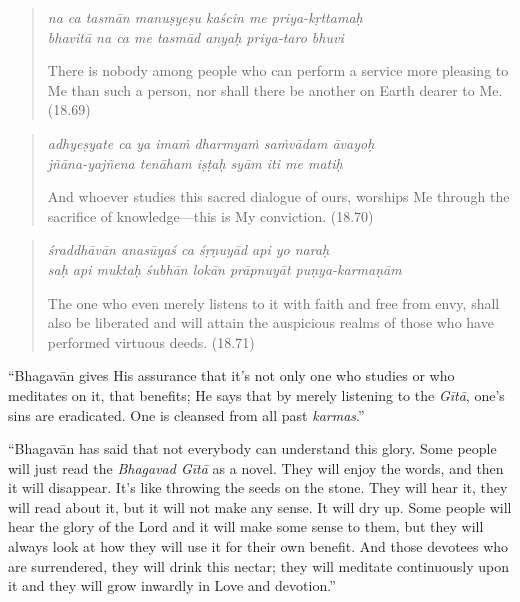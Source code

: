 \documentclass[12pt, twoside, openright]{memoir}
\begin{document}
\par
\begin{verse}
\textit{na ca tasmān manuṣyeṣu kaścin me priya-kṛttamaḥ} \\
\textit{bhavitā na ca me tasmād anyaḥ priya-taro bhuvi}

\noindent There is nobody among people who can perform a service more pleasing to Me than such a person, nor shall there be another on Earth dearer to Me. (18.69)
\end{verse}
\par



\par
\begin{verse}
\textit{adhyeṣyate ca ya imaṁ dharmyaṁ saṁvādam āvayoḥ} \\
\textit{jñāna-yajñena tenāham iṣṭaḥ syām iti me matiḥ}

\noindent And whoever studies this sacred dialogue of ours, worships Me through the sacrifice of knowledge---this is My conviction. (18.70)
\end{verse}
\par



\par
\begin{verse}
\textit{śraddhāvān anasūyaś ca śṛṇuyād api yo naraḥ} \\
\textit{saḥ api muktaḥ śubhān lokān prāpnuyāt puṇya-karmaṇām}

\noindent The one who even merely listens to it with faith and free from envy, shall also be liberated and will attain the auspicious realms of those who have performed virtuous deeds. (18.71)
\end{verse}
\par


\enquote{Bhagavān gives His assurance that it’s not only one who studies or who meditates on it, that benefits; He says that by merely listening to the \textit{Gītā}, one’s sins are eradicated. One is cleansed from all past \textit{karmas}.}

\enquote{Bhagavān has said that not everybody can understand this glory. Some people will just read the \textit{Bhagavad Gītā} as a novel. They will enjoy the words, and then it will disappear. It’s like throwing the seeds on the stone. They will hear it, they will read about it, but it will not make any sense. It will dry up. Some people will hear the glory of the Lord and it will make some sense to them, but they will always look at how they will use it for their own benefit. And those devotees who are surrendered, they will drink this nectar; they will meditate continuously upon it and they will grow inwardly in Love and devotion.}
\end{document}
